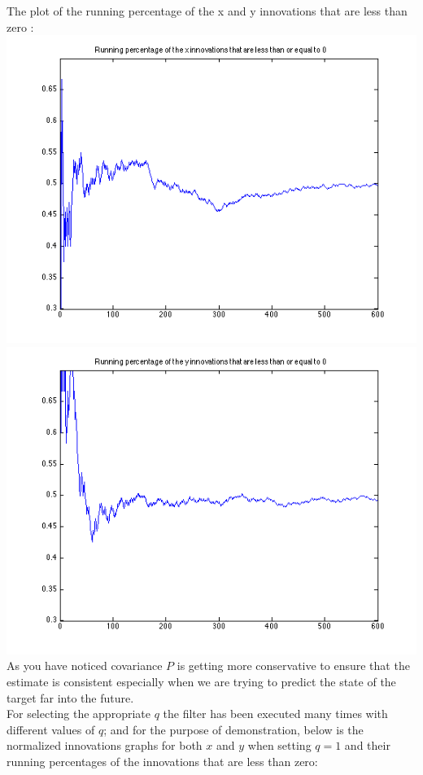 \documentclass[a4paper]{article}
\begin{document}
The plot of the running percentage of the x and y innovations that are less than zero : \\
\includegraphics[scale=.4]{target_2_x_running_q_0_1.png}
\includegraphics[scale=.4]{target_2_y_running_q_0_1.png} \\

As you have noticed covariance $P$ is getting more conservative to ensure that the estimate is consistent especially when we are trying to predict the state of the target far into the future. \\

For selecting the appropriate $q$ the filter has been executed many times with different values of $q$; and for the purpose of demonstration, below is the normalized innovations graphs for both $x$ and $y$ when setting $q=1$ and their running percentages of the innovations that are less than zero: \\
\end{document}
